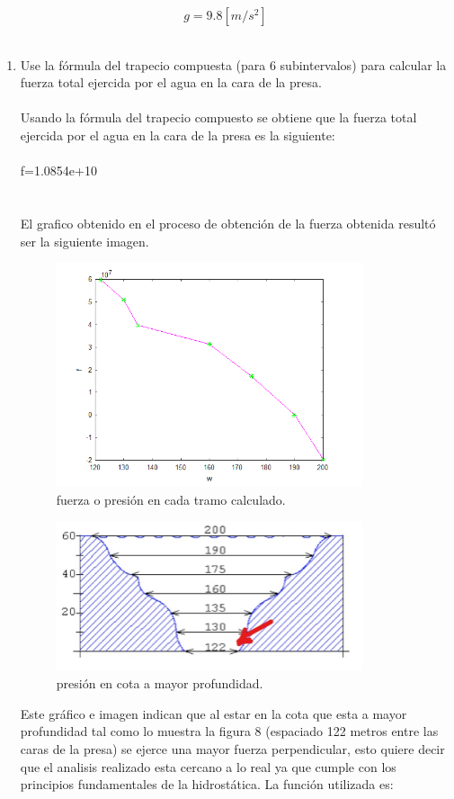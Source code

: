 \documentclass{udpreport}
\begin{document}
\begin{enumerate}
\begin{equation}
g=9.8[m/s^2]
\end{equation}
\\
 \begin{enumerate}
 \item Use la fórmula del trapecio compuesta (para 6 subintervalos) para calcular la fuerza total ejercida por el agua en la cara de la presa.
 \\ 
 \\
 Usando la fórmula del trapecio compuesto se obtiene que la fuerza total ejercida por el agua en la cara de la presa es la siguiente:
 \\
 \\
 f=1.0854e+10
 \\
 \\
 \\
 El grafico obtenido en el proceso de obtención de la fuerza obtenida resultó ser la siguiente imagen.
 \begin{figure}[H]
    \centering
    \includegraphics[width=9cm]{fuerza_trap}
    \caption{fuerza o presión en cada tramo calculado.} \label{fig:fuerza_trap}
\end{figure}
 \begin{figure}[H]
    \centering
    \includegraphics[width=9cm]{presionfin}
    \caption{presión en cota a mayor profundidad.} \label{fig:presionfin}
\end{figure}
Este gráfico e imagen indican que al estar en la cota que esta a mayor profundidad tal como lo muestra la figura 8 (espaciado 122 metros entre las caras de la presa) se ejerce una mayor fuerza perpendicular, esto quiere decir que el analisis realizado esta cercano a lo real ya que cumple con los principios fundamentales de la hidrostática. 
La función utilizada es:
 

\end{enumerate}
\end{enumerate}
\end{document}
